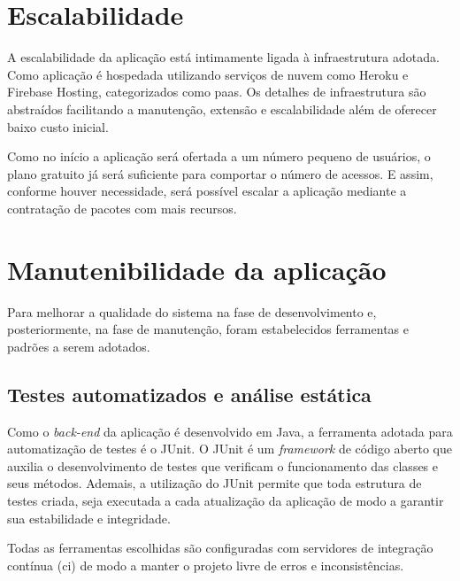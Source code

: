 \section{Escalabilidade}
A escalabilidade da aplicação está intimamente ligada à infraestrutura adotada. Como aplicação é hospedada utilizando serviços de nuvem como Heroku e Firebase Hosting, categorizados como \ac{paas}. Os detalhes de infraestrutura são abstraídos facilitando a manutenção, extensão e escalabilidade além de oferecer baixo custo inicial. 

Como no início a aplicação será ofertada a um número pequeno de usuários, o plano gratuito já será suficiente para comportar o número de acessos. E assim, conforme houver necessidade, será possível escalar a aplicação mediante a contratação de pacotes com mais recursos.

\section{Manutenibilidade da aplicação}
Para melhorar a qualidade do sistema na fase de desenvolvimento e, posteriormente, na fase de manutenção, foram estabelecidos ferramentas e padrões a serem adotados.

\subsection{Testes automatizados e análise estática}


Como o \textit{\gls{back-end}} da aplicação é desenvolvido em Java, a ferramenta adotada para automatização de testes é o JUnit. O JUnit é um \textit{\gls{framework}} de código aberto que auxilia o desenvolvimento de testes que verificam o funcionamento das classes e seus métodos. Ademais, a utilização do JUnit permite que toda estrutura de testes criada, seja executada a cada atualização da aplicação  de modo a garantir sua estabilidade e integridade.




Todas as ferramentas escolhidas são configuradas com servidores de integração contínua (\ac{ci}) de modo a manter o projeto livre de erros e inconsistências.


